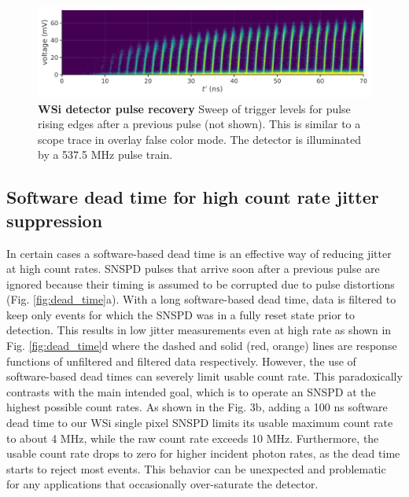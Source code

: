 \documentclass[11pt]{caltech_thesis} %
\begin{document}
\hypertarget{fig:rise_exp}{%
\begin{figure}
\centering
\includegraphics[width=1\textwidth,height=\textheight]{./chapter_03/figs/rise_exp_light.pdf}
\caption[{WSi pulse exponential pulse recovery}]{\textbf{WSi detector pulse recovery} Sweep of trigger levels for pulse rising edges after a previous pulse (not shown). This is similar to a scope trace in overlay false color mode. The detector is illuminated by a 537.5 MHz pulse train.}
\label{fig:rise_exp}
\end{figure}
}

\hypertarget{software-dead-time-for-high-count-rate-jitter-suppression}{%
\subsection{Software dead time for high count rate jitter suppression}\label{software-dead-time-for-high-count-rate-jitter-suppression}}

In certain cases a software-based dead time is an effective way of reducing jitter at high count rates. SNSPD pulses that arrive soon after a previous pulse are ignored because their timing is assumed to be corrupted due to pulse distortions (Fig. \ref{fig:dead_time}a). With a long software-based dead time, data is filtered to keep only events for which the SNSPD was in a fully reset state prior to detection. This results in low jitter measurements even at high rate as shown in Fig. \ref{fig:dead_time}d where the dashed and solid (red, orange) lines are response functions of unfiltered and filtered data respectively. However, the use of software-based dead times can severely limit usable count rate. This paradoxically contrasts with the main intended goal, which is to operate an SNSPD at the highest possible count rates. As shown in the Fig. 3b, adding a 100 ns software dead time to our WSi single pixel SNSPD limits its usable maximum count rate to about 4 MHz, while the raw count rate exceeds 10 MHz. Furthermore, the usable count rate drops to zero for higher incident photon rates, as the dead time starts to reject most events. This behavior can be unexpected and problematic for any applications that occasionally over-saturate the detector.
\end{document}
